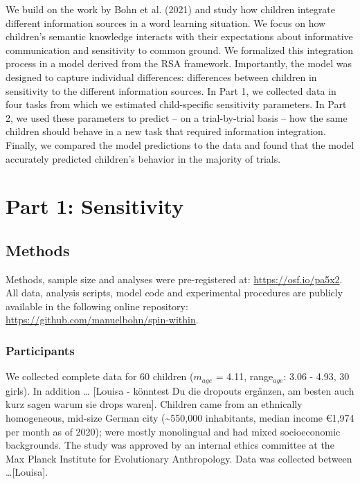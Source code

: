 \documentclass[
  man,floatsintext]{apa6}
\begin{document}
We build on the work by Bohn et al. (2021) and study how children integrate different information sources in a word learning situation. We focus on how children's semantic knowledge interacts with their expectations about informative communication and sensitivity to common ground. We formalized this integration process in a model derived from the RSA framework. Importantly, the model was designed to capture individual differences: differences between children in sensitivity to the different information sources. In Part 1, we collected data in four tasks from which we estimated child-specific sensitivity parameters. In Part 2, we used these parameters to predict -- on a trial-by-trial basis -- how the same children should behave in a new task that required information integration. Finally, we compared the model predictions to the data and found that the model accurately predicted children's behavior in the majority of trials.

\hypertarget{part-1-sensitivity}{%
\section{Part 1: Sensitivity}\label{part-1-sensitivity}}

\hypertarget{methods}{%
\subsection{Methods}\label{methods}}

Methods, sample size and analyses were pre-registered at: \url{https://osf.io/pa5x2}. All data, analysis scripts, model code and experimental procedures are publicly available in the following online repository: \url{https://github.com/manuelbohn/spin-within}.

\hypertarget{participants}{%
\subsubsection{Participants}\label{participants}}

We collected complete data for 60 children (\(m_{age}\) = 4.11, range\(_{age}\): 3.06 - 4.93, 30 girls). In addition \ldots{} {[}Louisa - könntest Du die dropouts ergänzen, am besten auch kurz sagen warum sie drops waren{]}. Children came from an ethnically homogeneous, mid-size German city (\textasciitilde550,000 inhabitants, median income €1,974 per month as of 2020); were mostly monolingual and had mixed socioeconomic backgrounds. The study was approved by an internal ethics committee at the Max Planck Institute for Evolutionary Anthropology. Data was collected between \ldots{[}Louisa{]}.
\end{document}
